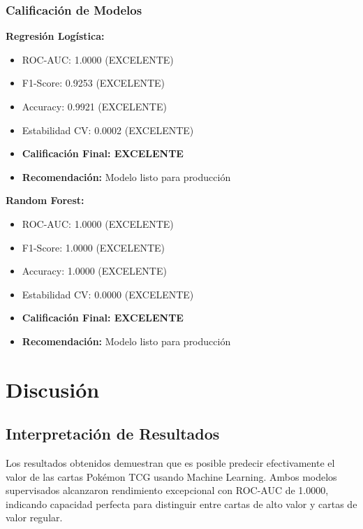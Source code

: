 \documentclass[12pt,letterpaper]{article}
\begin{document}
\subsubsection{Calificación de Modelos}

\textbf{Regresión Logística:}
\begin{itemize}
    \item ROC-AUC: 1.0000 (EXCELENTE)
    \item F1-Score: 0.9253 (EXCELENTE)
    \item Accuracy: 0.9921 (EXCELENTE)
    \item Estabilidad CV: 0.0002 (EXCELENTE)
    \item \textbf{Calificación Final: EXCELENTE}
    \item \textbf{Recomendación:} Modelo listo para producción
\end{itemize}

\textbf{Random Forest:}
\begin{itemize}
    \item ROC-AUC: 1.0000 (EXCELENTE)
    \item F1-Score: 1.0000 (EXCELENTE)
    \item Accuracy: 1.0000 (EXCELENTE)
    \item Estabilidad CV: 0.0000 (EXCELENTE)
    \item \textbf{Calificación Final: EXCELENTE}
    \item \textbf{Recomendación:} Modelo listo para producción
\end{itemize}

\section{Discusión}

\subsection{Interpretación de Resultados}

Los resultados obtenidos demuestran que es posible predecir efectivamente el valor de las cartas Pokémon TCG usando Machine Learning. Ambos modelos supervisados alcanzaron rendimiento excepcional con ROC-AUC de 1.0000, indicando capacidad perfecta para distinguir entre cartas de alto valor y cartas de valor regular.
\end{document}
